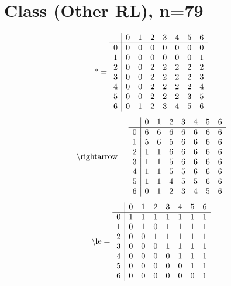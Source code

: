 \documentclass[11pt]{article}
\begin{document}
\section{Class (Other RL), n=79}
\[\text{*} = 
\begin{array}{r | r r r r r r r}
 & 0 & 1 & 2 & 3 & 4 & 5 & 6 \\ \hline
0 & 0 & 0 & 0 & 0 & 0 & 0 & 0 \\
1 & 0 & 0 & 0 & 0 & 0 & 0 & 1 \\
2 & 0 & 0 & 2 & 2 & 2 & 2 & 2 \\
3 & 0 & 0 & 2 & 2 & 2 & 2 & 3 \\
4 & 0 & 0 & 2 & 2 & 2 & 2 & 4 \\
5 & 0 & 0 & 2 & 2 & 2 & 3 & 5 \\
6 & 0 & 1 & 2 & 3 & 4 & 5 & 6 \\
\end{array}
\]
\[\text{\textbackslash rightarrow} = 
\begin{array}{r | r r r r r r r}
 & 0 & 1 & 2 & 3 & 4 & 5 & 6 \\ \hline
0 & 6 & 6 & 6 & 6 & 6 & 6 & 6 \\
1 & 5 & 6 & 5 & 6 & 6 & 6 & 6 \\
2 & 1 & 1 & 6 & 6 & 6 & 6 & 6 \\
3 & 1 & 1 & 5 & 6 & 6 & 6 & 6 \\
4 & 1 & 1 & 5 & 5 & 6 & 6 & 6 \\
5 & 1 & 1 & 4 & 5 & 5 & 6 & 6 \\
6 & 0 & 1 & 2 & 3 & 4 & 5 & 6 \\
\end{array}
\]
\[\text{\textbackslash le} = 
\begin{array}{r | r r r r r r r}
 & 0 & 1 & 2 & 3 & 4 & 5 & 6 \\ \hline
0 & 1 & 1 & 1 & 1 & 1 & 1 & 1 \\
1 & 0 & 1 & 0 & 1 & 1 & 1 & 1 \\
2 & 0 & 0 & 1 & 1 & 1 & 1 & 1 \\
3 & 0 & 0 & 0 & 1 & 1 & 1 & 1 \\
4 & 0 & 0 & 0 & 0 & 1 & 1 & 1 \\
5 & 0 & 0 & 0 & 0 & 0 & 1 & 1 \\
6 & 0 & 0 & 0 & 0 & 0 & 0 & 1 \\
\end{array}
\]
\end{document}
